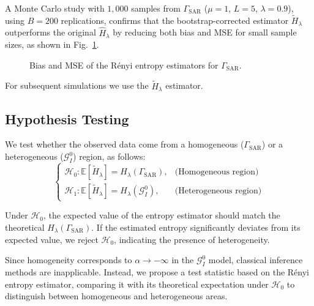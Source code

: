 \documentclass[
  journal,
]{IEEEtran}%
\begin{document}
A Monte Carlo study with \(1,000\) samples from \(\Gamma_{\text{SAR}}\)
(\(\mu = 1\), \(L=5\), \(\lambda = 0.9\)), using \(B = 200\)
replications, confirms that the bootstrap-corrected estimator
\(\widetilde{H}_{\lambda}\) outperforms the original
\(\widehat{H}_{\lambda}\) by reducing both bias and MSE for small sample
sizes, as shown in Fig.~\ref{fig-Plot_bias_msef3}.

\begin{figure}[hbt]


\caption{\label{fig-Plot_bias_msef3}Bias and MSE of the Rényi entropy
estimators for \(\Gamma_{\text{SAR}}\).}

\end{figure}%

For subsequent simulations we use the \(\widetilde{H}_{\lambda}\)
estimator.

\subsection{Hypothesis Testing}\label{hypothesis-testing}

We test whether the observed data come from a homogeneous
(\(\Gamma_{\text{SAR}}\)) or a heterogeneous (\(\mathcal{G}^0_I\))
region, as follows: \begin{equation}\label{eq:hypothesis_test}
\begin{cases}
\mathcal{H}_0: \mathbb{E}[\widetilde{H}_{\lambda}] = H_{\lambda}(\Gamma_{\text{SAR}}), & \text{(Homogeneous region)} \\[6pt]
\mathcal{H}_1: \mathbb{E}[\widetilde{H}_{\lambda}] = H_{\lambda}(\mathcal{G}^0_I), & \text{(Heterogeneous region)}
\end{cases}
\end{equation}

Under \(\mathcal{H}_0\), the expected value of the entropy estimator
should match the theoretical \(H_{\lambda}(\Gamma_{\text{SAR}})\). If
the estimated entropy significantly deviates from its expected value, we
reject \(\mathcal{H}_0\), indicating the presence of heterogeneity.

Since homogeneity corresponds to \(\alpha \to -\infty\) in the
\(\mathcal{G}^0_I\) model, classical inference methods are inapplicable.
Instead, we propose a test statistic based on the Rényi entropy
estimator, comparing it with its theoretical expectation under
\(\mathcal{H}_0\) to distinguish between homogeneous and heterogeneous
areas.
\end{document}
